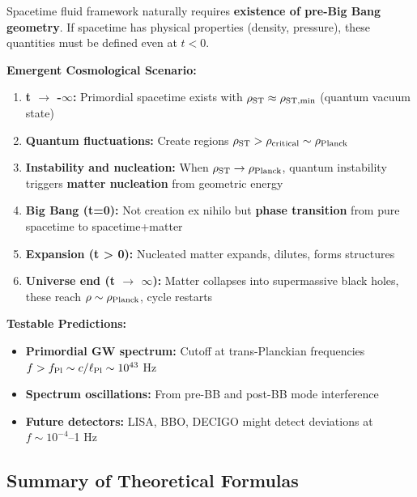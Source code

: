 \documentclass[11pt,a4paper]{article}
\providecommand{\tightlist}{\setlength{\itemsep}{0pt}\setlength{\parskip}{0pt}}
\begin{document}
Spacetime fluid framework naturally requires \textbf{existence of
pre-Big Bang geometry}. If spacetime has physical properties (density,
pressure), these quantities must be defined even at \(t < 0\).

\textbf{Emergent Cosmological Scenario:}

\begin{enumerate}
\def\labelenumi{\arabic{enumi}.}
\item
  \textbf{t $\rightarrow$ -$\infty$:} Primordial spacetime exists with
  \(\rho_{\rm ST} \approx \rho_{\rm ST,min}\) (quantum vacuum state)
\item
  \textbf{Quantum fluctuations:} Create regions
  \(\rho_{\rm ST} > \rho_{\rm critical} \sim \rho_{\rm Planck}\)
\item
  \textbf{Instability and nucleation:} When
  \(\rho_{\rm ST} \to \rho_{\rm Planck}\), quantum instability triggers
  \textbf{matter nucleation} from geometric energy
\item
  \textbf{Big Bang (t=0):} Not creation ex nihilo but \textbf{phase
  transition} from pure spacetime to spacetime+matter
\item
  \textbf{Expansion (t \textgreater{} 0):} Nucleated matter expands,
  dilutes, forms structures
\item
  \textbf{Universe end (t $\rightarrow$ $\infty$):} Matter collapses into supermassive
  black holes, these reach \(\rho \sim \rho_{\rm Planck}\), cycle
  restarts
\end{enumerate}

\textbf{Testable Predictions:}

\begin{itemize}
\tightlist
\item
  \textbf{Primordial GW spectrum:} Cutoff at trans-Planckian frequencies
  \(f > f_{\rm Pl} \sim c/\ell_{\rm Pl} \sim 10^{43}\) Hz
\item
  \textbf{Spectrum oscillations:} From pre-BB and post-BB mode
  interference
\item
  \textbf{Future detectors:} LISA, BBO, DECIGO might detect deviations
  at \(f \sim 10^{-4}\)--1 Hz
\end{itemize}

\hypertarget{summary-of-theoretical-formulas}{%
\subsection{Summary of Theoretical
Formulas}\label{summary-of-theoretical-formulas}}
\end{document}
